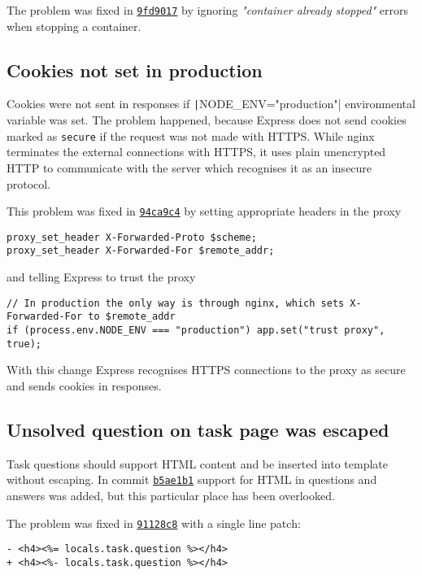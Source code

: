 The problem was fixed in \href{https://github.com/krzysdz/inz/commit/9fd9017ce994f577233ce0544bbd0cf1df3e0e55}{\texttt{9fd9017}} by ignoring \textit{"container already stopped"} errors when stopping a container.

\subsection{Cookies not set in production}

Cookies were not sent in responses if \texttt|NODE_ENV="production"| environmental variable was set. The problem happened, because Express does not send cookies marked as \texttt{secure} if the request was not made with HTTPS. While nginx terminates the external connections with HTTPS, it uses plain unencrypted HTTP to communicate with the server which recognises it as an insecure protocol.

This problem was fixed in \href{https://github.com/krzysdz/inz/commit/94ca9c4124954c94c9fe8e27dc59305aa59b31ad}{\texttt{94ca9c4}} by setting appropriate headers in the proxy
\begin{verbatim}
proxy_set_header X-Forwarded-Proto $scheme;
proxy_set_header X-Forwarded-For $remote_addr;
\end{verbatim}
and telling Express to trust the proxy
\begin{verbatim}
// In production the only way is through nginx, which sets X-Forwarded-For to $remote_addr
if (process.env.NODE_ENV === "production") app.set("trust proxy", true);
\end{verbatim}
With this change Express recognises HTTPS connections to the proxy as secure and sends cookies in responses.

\subsection{Unsolved question on task page was escaped}

Task questions should support HTML content and be inserted into template without escaping. In commit \href{https://github.com/krzysdz/inz/commit/b5ae1b16e9be6060b43f28dbb56b090bfb46dd98}{\texttt{b5ae1b1}} support for HTML in questions and answers was added, but this particular place has been overlooked.

The problem was fixed in \href{https://github.com/krzysdz/inz/commit/91128c835889ac0429b478d03c6992541fcdd5c3}{\texttt{91128c8}} with a single line patch:
\begin{verbatim}
- <h4><%= locals.task.question %></h4>
+ <h4><%- locals.task.question %></h4>
\end{verbatim}

